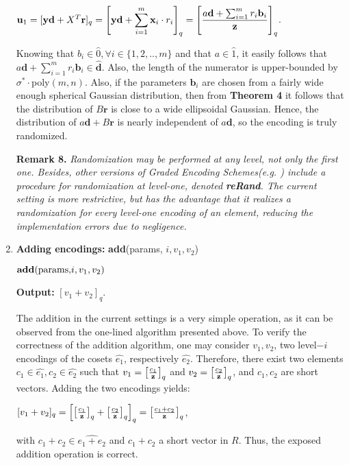 \begin{enumerate}[label=(\alph*)]
\begin{center}
	$\textbf{u}_1 = [\textbf{yd} + X^T\textbf{r}]_q = \Bigg[\textbf{yd} + \displaystyle{\sum_{i = 1}^{m} \textbf{x}_i \cdot r_i} \Bigg]_q = \Bigg[ \frac{a\textbf{d} + \sum_{i = 1}^{m} r_i \textbf{b}_i}{\textbf{z}} \Bigg]_q$.
\end{center}

Knowing that $b_i \in \hat{0}, \forall i\in \{1,2,..,m\}$ and that $a \in \hat{1}$, it easily follows that $a\textbf{d} + \sum_{i = 1}^{m} r_i \textbf{b}_i \in \hat{\textbf{d}}$. Also, the length of the numerator is upper-bounded by $\sigma^*\cdot$poly$(m,n)$. Also, if the parameters $\textbf{b}_i$ are chosen from a fairly wide enough spherical Gaussian distribution, then from \textbf{Theorem 4} it follows that the distribution of $B\textbf{r}$ is close to a wide ellipsoidal Gaussian. Hence, the distribution of $a\textbf{d} + B\textbf{r}$ is nearly independent of $a\textbf{d}$, so the encoding is truly randomized. 

\textbf{Remark 8.} \textit{Randomization may be performed at any level, not only the first one. Besides, other versions of Graded Encoding Schemes(e.g. \cite{CLT13}) include a procedure for randomization at level-one, denoted \textbf{reRand}. The current setting is more restrictive, but has the advantage that it realizes a randomization for every level-one encoding of an element, reducing the implementation errors due to negligence.}\\


\item \textbf{Adding encodings:} \textbf{add}(params, $i, v_1, v_2$)

\begin{tcolorbox}[colframe=black,colback=white,arc=0pt,outer arc=0pt]
\begin{center}
$\text{\textbf{add}(params,}i, v_1, v_2)$
\end{center}
\begin{algorithmic}[1]
\State \textbf{Output:} $[v_1+v_2]_q$.
\end{algorithmic}
\end{tcolorbox}

The addition in the current settings is a very simple operation, as it can be observed from the one-lined algorithm presented above. To verify the correctness of the addition algorithm, one may consider $v_1, v_2$, two level$-i$ encodings of the cosets $\widehat{e_1}$, respectively $\widehat{e_2}$. Therefore, there exist two elements $c_1 \in \widehat{e_1}, c_2\in\widehat{e_2}$ such that $v_1 = \big[ \frac{c_1}{\textbf{z}} \big]_q$ and $v_2 = \big[ \frac{c_2}{\textbf{z}} \big]_q$, and $c_1, c_2$ are short vectors. Adding the two encodings yields:
\begin{center}
	$[v_1+v_2]_q = \Big[ \big[ \frac{c_1}{\textbf{z}} \big]_q + \big[ \frac{c_2}{\textbf{z}}\big]_q \Big]_q = \big[\frac{c_1+c_2}{\textbf{z}}\big]_q$,
\end{center}
with $c_1+c_2 \in \widehat{e_1+e_2}$ and $c_1 + c_2$ a short vector in $R$. Thus, the exposed addition operation is correct.\\


\end{enumerate}
